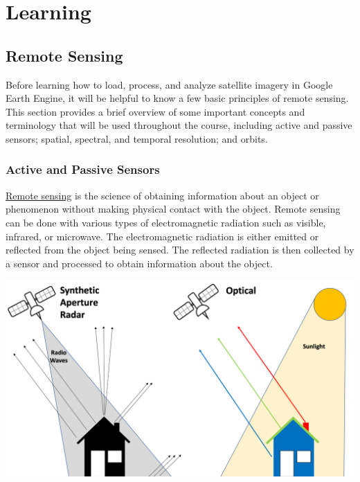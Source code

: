 \documentclass[
  letterpaper,
  DIV=11,
  numbers=noendperiod]{scrreprt}
\begin{document}
\part{Learning}

\hypertarget{remote-sensing}{%
\chapter{Remote Sensing}\label{remote-sensing}}

Before learning how to load, process, and analyze satellite imagery in
Google Earth Engine, it will be helpful to know a few basic principles
of remote sensing. This section provides a brief overview of some
important concepts and terminology that will be used throughout the
course, including active and passive sensors; spatial, spectral, and
temporal resolution; and orbits.

\hypertarget{active-and-passive-sensors}{%
\section{Active and Passive Sensors}\label{active-and-passive-sensors}}

\href{https://www.sciencedirect.com/topics/medicine-and-dentistry/remote-sensing}{Remote
sensing} is the science of obtaining information about an object or
phenomenon without making physical contact with the object. Remote
sensing can be done with various types of electromagnetic radiation such
as visible, infrared, or microwave. The electromagnetic radiation is
either emitted or reflected from the object being sensed. The reflected
radiation is then collected by a sensor and processed to obtain
information about the object.

\includegraphics{././images/diagram.png}
\end{document}
